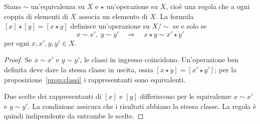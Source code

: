 \begin{proposizione}
Siano $\sim$ un'equivalenza su $X$ e $\star$ un'operazione su $X$, cioè una regola che a ogni coppia di elementi di $X$ associa un elemento di $X$. La formula $[x]\mathbin{\overline\star}[y]=[x\star y]$ definisce un'operazione su $X/{\sim}$ se e solo se
\[
x\sim x',\ y\sim y'\quad\Longrightarrow\quad x\star y\sim x'\star y'
\]
per ogni $x,x',y,y'\in X$.
\end{proposizione}
\begin{proof}
\passomath{\Rightarrow} Se $x\sim x'$ e $y\sim y'$, le classi in ingresso coincidono. Un'operazione ben definita deve dare la stessa classe in uscita, ossia $[x\star y]=[x'\star y']$; per la proposizione~\ref{prop:classi} i rappresentanti sono equivalenti.

\passomath{\Leftarrow} Due scelte dei rappresentanti di $[x]$ e $[y]$ differiscono per le equivalenze $x\sim x'$ e $y\sim y'$. La condizione assicura che i risultati abbiano la stessa classe. La regola è quindi indipendente da entrambe le scelte.
\end{proof}

